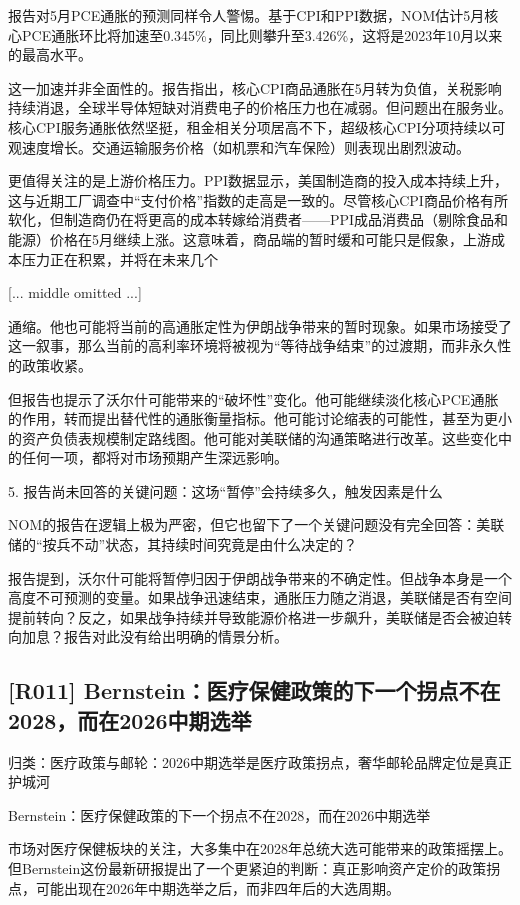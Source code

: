 \documentclass[11pt]{ctexart}
\begin{document}
报告对5月PCE通胀的预测同样令人警惕。基于CPI和PPI数据，NOM估计5月核心PCE通胀环比将加速至0.345\%，同比则攀升至3.426\%，这将是2023年10月以来的最高水平。

这一加速并非全面性的。报告指出，核心CPI商品通胀在5月转为负值，关税影响持续消退，全球半导体短缺对消费电子的价格压力也在减弱。但问题出在服务业。核心CPI服务通胀依然坚挺，租金相关分项居高不下，超级核心CPI分项持续以可观速度增长。交通运输服务价格（如机票和汽车保险）则表现出剧烈波动。

更值得关注的是上游价格压力。PPI数据显示，美国制造商的投入成本持续上升，这与近期工厂调查中“支付价格”指数的走高是一致的。尽管核心CPI商品价格有所软化，但制造商仍在将更高的成本转嫁给消费者——PPI成品消费品（剔除食品和能源）价格在5月继续上涨。这意味着，商品端的暂时缓和可能只是假象，上游成本压力正在积累，并将在未来几个

[... middle omitted ...]

通缩。他也可能将当前的高通胀定性为伊朗战争带来的暂时现象。如果市场接受了这一叙事，那么当前的高利率环境将被视为“等待战争结束”的过渡期，而非永久性的政策收紧。

但报告也提示了沃尔什可能带来的“破坏性”变化。他可能继续淡化核心PCE通胀的作用，转而提出替代性的通胀衡量指标。他可能讨论缩表的可能性，甚至为更小的资产负债表规模制定路线图。他可能对美联储的沟通策略进行改革。这些变化中的任何一项，都将对市场预期产生深远影响。

5. 报告尚未回答的关键问题：这场“暂停”会持续多久，触发因素是什么

NOM的报告在逻辑上极为严密，但它也留下了一个关键问题没有完全回答：美联储的“按兵不动”状态，其持续时间究竟是由什么决定的？

报告提到，沃尔什可能将暂停归因于伊朗战争带来的不确定性。但战争本身是一个高度不可预测的变量。如果战争迅速结束，通胀压力随之消退，美联储是否有空间提前转向？反之，如果战争持续并导致能源价格进一步飙升，美联储是否会被迫转向加息？报告对此没有给出明确的情景分析。

\subsection{[R011] Bernstein：医疗保健政策的下一个拐点不在2028，而在2026中期选举}
{\small\color{refgray}归类：医疗政策与邮轮：2026中期选举是医疗政策拐点，奢华邮轮品牌定位是真正护城河}

Bernstein：医疗保健政策的下一个拐点不在2028，而在2026中期选举

市场对医疗保健板块的关注，大多集中在2028年总统大选可能带来的政策摇摆上。但Bernstein这份最新研报提出了一个更紧迫的判断：真正影响资产定价的政策拐点，可能出现在2026年中期选举之后，而非四年后的大选周期。
\end{document}
